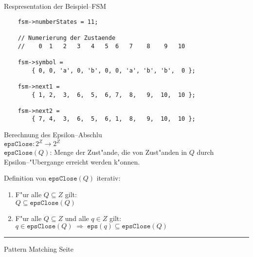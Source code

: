 
\begin{slide}{}
\normalsize

\begin{center}
Respresentation der Beispiel--FSM
\end{center}
\vspace*{0.5cm}

\footnotesize
\begin{verbatim}
    fsm->numberStates = 11;

    // Numerierung der Zustaende
    //    0  1   2   3   4   5  6   7    8    9   10

    fsm->symbol = 
        { 0, 0, 'a', 0, 'b', 0, 0, 'a', 'b', 'b',  0 };

    fsm->next1 = 
        { 1, 2,  3,  6,  5,  6, 7,  8,   9,  10,  10 };
    
    fsm->next2 = 
        { 7, 4,  3,  6,  5,  6, 1,  8,   9,  10,  10 };
\end{verbatim}
\vspace*{0.5cm}

Berechnung des Epsilon--Abschlu\3 \\[0.3cm]
\hspace*{1.3cm} $\mathtt{epsClose}: 2^Z \rightarrow 2^Z$ \\[0.3cm]
$\mathtt{epsClose}(Q)$: Menge der Zust"ande, die von Zust"anden in $Q$ durch
Epsilon--"Ubergange erreicht werden k"onnen.

Definition von $\mathtt{epsClose}(Q)$ iterativ:
\begin{enumerate}
\item F"ur alle $Q \subseteq Z$ gilt: \\[0.3cm]
      \hspace*{1.3cm} $Q \subseteq \mathtt{epsClose}(Q)$
\item F"ur alle $Q \subseteq Z$ und alle $q \in Z$ gilt: \\[0.3cm]
      $q \in \mathtt{epsClose}(Q) \;\Rightarrow\; \mathtt{eps}(q) \subseteq \mathtt{epsClose}(Q)$
\end{enumerate}

\vspace*{\fill}
\tiny \addtocounter{mypage}{1}
\rule{17cm}{1mm}
Pattern Matching \hspace*{\fill} Seite 
\end{slide}


